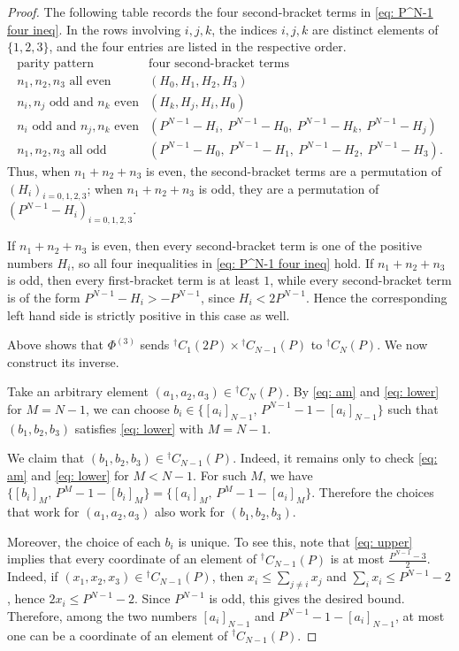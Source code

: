 \documentclass[11pt]{amsart}
\begin{document}
\begin{proof}
The following table records the four second-bracket terms in
\eqref{eq: P^N-1 four ineq}.  In the rows involving $i,j,k$, the indices
$i,j,k$ are distinct elements of $\{1,2,3\}$, and the four entries are listed
in the respective order.
\[
\begin{array}{c|c}
\text{parity pattern} & \text{four second-bracket terms} \\ \hline
n_1,n_2,n_3 \text{ all even}
& (H_0,H_1,H_2,H_3)\\
n_i,n_j \text{ odd and } n_k \text{ even}
& (H_k,H_j,H_i,H_0)\\
n_i \text{ odd and } n_j,n_k \text{ even}
& (P^{N-1}-H_i,\ P^{N-1}-H_0,\ P^{N-1}-H_k,\ P^{N-1}-H_j)\\
n_1,n_2,n_3 \text{ all odd}
& (P^{N-1}-H_0,\ P^{N-1}-H_1,\ P^{N-1}-H_2,\ P^{N-1}-H_3).
\end{array}
\]
Thus, when $n_1+n_2+n_3$ is even, the second-bracket terms are a permutation
of $(H_i)_{i=0,1,2,3}$; when $n_1+n_2+n_3$ is odd, they are a permutation of
$(P^{N-1}-H_i)_{i=0,1,2,3}$.

If $n_1+n_2+n_3$ is even, then every second-bracket term is one of the positive
numbers $H_i$, so all four inequalities in \eqref{eq: P^N-1 four ineq} hold.
If $n_1+n_2+n_3$ is odd, then every first-bracket term is at least $1$, while
every second-bracket term is of the form $P^{N-1}-H_i>-P^{N-1}$, since
$H_i<2P^{N-1}$.  Hence the corresponding left hand side is strictly positive
in this case as well.

Above shows that $\Phi^{(3)}$ sends ${}^\dagger C_1(2P)\times {}^\dagger C_{N-1}(P)$ to ${}^\dagger C_{N}(P)$. We now construct its inverse.


Take an arbitrary element $(a_1,a_2,a_3)\in{}^\dagger C_N(P)$.
  By \eqref{eq: am} and \eqref{eq: lower} for \(M=N-1\), we can
choose
$b_i\in\{[a_i]_{N-1},\,P^{N-1}-1-[a_i]_{N-1}\}$
such that $(b_1,b_2,b_3)$ satisfies \eqref{eq: lower} with $M=N-1$.

We claim that $(b_1,b_2,b_3)\in{}^\dagger C_{N-1}(P)$.  Indeed, it remains
only to check \eqref{eq: am} and \eqref{eq: lower} for $M<N-1$. 
For such $M$,  we have $\{[b_i]_M,\,P^M-1-[b_i]_M\}
=
\{[a_i]_M,\,P^M-1-[a_i]_M\}$.
Therefore the choices that work for $(a_1,a_2,a_3)$ also work for
$(b_1,b_2,b_3)$.

Moreover, the choice of each $b_i$ is unique.  To see this, note that
\eqref{eq: upper} implies that every coordinate of an element of ${}^\dagger C_{N-1}(P)$ is at most $\frac{P^{N-1}-3}{2}$.
Indeed, if $(x_1,x_2,x_3)\in{}^\dagger C_{N-1}(P)$, then
$x_i\leq \sum_{j\neq i}x_j$ and $\sum_i x_i\leq P^{N-1}-2$, hence $2x_i\leq P^{N-1}-2$.  Since $P^{N-1}$ is odd, this gives the desired
bound.  
Therefore, among the two numbers $[a_i]_{N-1}$ and $P^{N-1}-1-[a_i]_{N-1}$,
at most one can be a coordinate of an element of
${}^\dagger C_{N-1}(P)$.


\end{proof}
\end{document}
